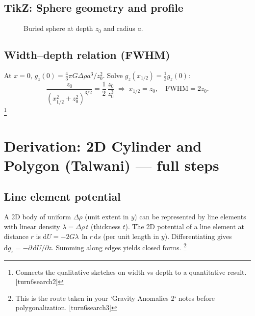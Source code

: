 \documentclass[11pt,a4paper]{article}
\begin{document}
\subsection*{TikZ: Sphere geometry and profile}
\begin{figure}[h]
\centering
{}
\caption{Buried sphere at depth $z_0$ and radius $a$.}
\end{figure}

\subsection{Width--depth relation (FWHM)}
At $x=0$, $g_z(0)= \tfrac{4}{3}\pi G\Delta\rho a^3/z_0^2$. Solve $g_z(x_{1/2})=\tfrac12 g_z(0)$:
\begin{equation}
  \frac{z_0}{(x_{1/2}^2+z_0^2)^{3/2}} = \frac{1}{2}\,\frac{z_0}{z_0^3} \;\Rightarrow\; x_{1/2}=z_0,\quad \text{FWHM}=2z_0.
\end{equation}
\footnote{Connects the qualitative sketches on width vs depth to a quantitative result. [turn6search2]}

\section{Derivation: 2D Cylinder and Polygon (Talwani) — full steps}
\subsection{Line element potential}
A 2D body of uniform $\Delta\rho$ (unit extent in $y$) can be represented by line elements with linear density $\lambda=\Delta\rho\,t$ (thickness $t$). The 2D potential of a line element at distance $r$ is $\mathrm{d}U = -2G\lambda\,\ln r\,\mathrm{d}s$ (per unit length in $y$). Differentiating gives $\mathrm{d}g_z= -\partial\,\mathrm{d}U/\partial z$. Summing along edges yields closed forms.
\footnote{This is the route taken in your `Gravity Anomalies 2` notes before polygonalization. [turn6search3]}
\end{document}
